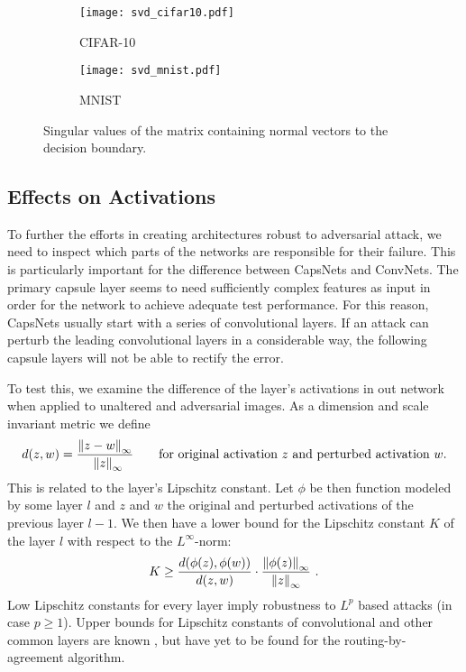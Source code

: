 \begin{figure}
	\centering
	\begin{subfigure}{.5\textwidth}
		\texttt{[image: svd\_cifar10.pdf]}
		\caption{CIFAR-10}
	\end{subfigure}%
	\begin{subfigure}{.5\textwidth}
		\texttt{[image: svd\_mnist.pdf]}
		\caption{MNIST}
	\end{subfigure}
	
	\caption[Singular values of adversarial perturbations]{Singular values of the matrix containing normal vectors to the decision boundary.}
	\label{fig:svd}
\end{figure}

\subsection{Effects on Activations}

To further the efforts in creating architectures robust to adversarial attack, we need to inspect which parts of the networks are responsible for their failure.
This is particularly important for the difference between CapsNets and ConvNets.
The primary capsule layer seems to need sufficiently complex features as input in order for the network to achieve adequate test performance.
For this reason, CapsNets usually start with a series of convolutional layers.
If an attack can perturb the leading convolutional layers in a considerable way, the following capsule layers will not be able to rectify the error.

To test this, we examine the difference of the layer's activations in out network when applied to unaltered and adversarial images. As a dimension and scale invariant metric we define
\begin{equation}
	d(z, w) = \frac{\norm[\infty]{z - w}}{\enspace \norm[\infty]{z}}
	\qquad \text{for original activation $z$ and perturbed activation $w$.}
\end{equation}
This is related to the layer's Lipschitz constant.
Let $\phi$ be then function modeled by some layer $l$ and $z$ and $w$ the original and perturbed activations of the previous layer $l-1$.
We then have a lower bound for the Lipschitz constant $K$ of the layer $l$ with respect to the $L^{\infty}$-norm:
\begin{equation}
K \geq \frac{d(\phi(z), \phi(w))}{d(z, w)} \cdot \frac{\norm[\infty]{\phi(z)}}{\norm[\infty]{z}}
\text{ .}
\end{equation}
Low Lipschitz constants for every layer imply robustness to $L^p$ based attacks (in case $p \geq 1$).
Upper bounds for Lipschitz constants of convolutional and other common layers are known \citep{intriguing},
but have yet to be found for the routing-by-agreement algorithm.

